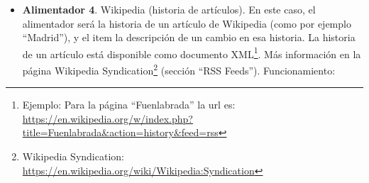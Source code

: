 \begin{itemize}
  \begin{itemize}
  \item Alimentador: Etiqueta de Flickr.
  \item Ítem: foto de Flickr.
  \item Elemento HTML para elegir el alimentador: formulario que permita escribir la etiqueta.
  \item Elemento HTML para actualizar el alimentador: botón que actualiza con las fotos de la etiqueta.
  \item Datos mostrados para el alimentador cuando se muestra resumido: etiqueta, enlace a las fotos con esa etiqueta en Flickr\footnote{Por ejemplo, para la etiqueta ``Fuenlabrada'', el enlace sería: \\\url{https://www.flickr.com/search/?tags=fuenlabrada}}, total de items disponibles para este alimentador, puntuación (total de votos positivos menos votos negativos para todos sus items).
  \item Datos mostrados para el alimentador cuando se muestra con detalle: etiqueta, enlace a la página de la etiqueta en Flickr, y lista de fotos para esa etiqueta (con información resumida).
  \item Datos mostrados del ítem (cuando se muestra resumido): título de la foto, enlace a la página de la foto en Flickr.
  \item Datos mostrados del ítem (cuando se muestra con detalle): título de la foto, enlace a la página de la foto en Flickr, foto, etiqueta, enlace a la página de la etiqueta en Flickr.
  \end{itemize}

\item \textbf{Alimentador 4}. Wikipedia (historia de artículos). En este caso, el alimentador será la historia de un artículo de Wikipedia (como por ejemplo ``Madrid''), y el item la descripción de un cambio en esa historia. La historia de un artículo está disponible como documento XML\footnote{Ejemplo: Para la página ``Fuenlabrada'' la url es: \\ \url{https://en.wikipedia.org/w/index.php?title=Fuenlabrada&action=history&feed=rss}}. Más información en la página Wikipedia Syndication\footnote{Wikipedia Syndication: \\ \url{https://en.wikipedia.org/wiki/Wikipedia:Syndication}} (sección ``RSS Feeds''). Funcionamiento:


\end{itemize}
